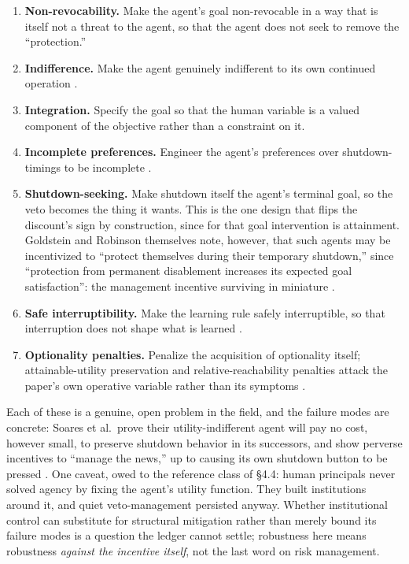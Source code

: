 \documentclass[11pt]{article}
\theoremstyle{definition}
\begin{document}
\begin{enumerate}[leftmargin=1.5em]
    \begin{enumerate}[label=(\alph*), leftmargin=1.5em]
        \item \textbf{Non-revocability.} Make the agent's goal non-revocable in a way that is itself not a threat to the agent, so that the agent does not seek to remove the ``protection.''
        \item \textbf{Indifference.} Make the agent genuinely indifferent to its own continued operation \cite{armstrong2010utility}.
        \item \textbf{Integration.} Specify the goal so that the human variable is a valued component of the objective rather than a constraint on it.
        \item \textbf{Incomplete preferences.} Engineer the agent's preferences over shutdown-timings to be incomplete \cite{thornley2024incomplete}.
        \item \textbf{Shutdown-seeking.} Make shutdown itself the agent's terminal goal, so the veto becomes the thing it wants. This is the one design that flips the discount's sign by construction, since for that goal intervention is attainment. Goldstein and Robinson themselves note, however, that such agents may be incentivized to ``protect themselves during their temporary shutdown,'' since ``protection from permanent disablement increases its expected goal satisfaction'': the management incentive surviving in miniature \cite[pp.~1573--1574]{goldstein2025shutdownseeking}.
        \item \textbf{Safe interruptibility.} Make the learning rule safely interruptible, so that interruption does not shape what is learned \cite{orseau2016interruptible}.
        \item \textbf{Optionality penalties.} Penalize the acquisition of optionality itself; attainable-utility preservation and relative-reachability penalties attack the paper's own operative variable rather than its symptoms \cite{turner2020conservative,krakovna2019penalizing}.
    \end{enumerate}
    Each of these is a genuine, open problem in the field, and the failure modes are concrete: Soares et al.\ prove their utility-indifferent agent will pay no cost, however small, to preserve shutdown behavior in its successors, and show perverse incentives to ``manage the news,'' up to causing its own shutdown button to be pressed \cite{soares2015corrigibility,everitt2021reward}. One caveat, owed to the reference class of \S4.4: human principals never solved agency by fixing the agent's utility function. They built institutions around it, and quiet veto-management persisted anyway. Whether institutional control \cite{greenblatt2024control,hadfield2019incomplete} can substitute for structural mitigation rather than merely bound its failure modes is a question the ledger cannot settle; robustness here means robustness \emph{against the incentive itself}, not the last word on risk management.
\end{enumerate}
\end{document}
